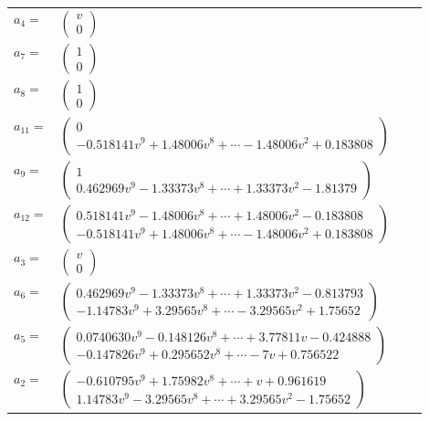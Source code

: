 \documentclass[1p]{elsarticle_modified}
\theoremstyle{definition}
\begin{document}
\begin{tabular}{m{7pt} m{180pt} m{7pt} m{180pt} }
\flushright $a_{4}=$&$\begin{pmatrix}v\\0\end{pmatrix}$ \\
\flushright $a_{7}=$&$\begin{pmatrix}1\\0\end{pmatrix}$ \\
\flushright $a_{8}=$&$\begin{pmatrix}1\\0\end{pmatrix}$ \\
\flushright $a_{11}=$&$\begin{pmatrix}0\\-0.518141 v^{9}+1.48006 v^{8}+\cdots-1.48006 v^{2}+0.183808\end{pmatrix}$ \\
\flushright $a_{9}=$&$\begin{pmatrix}1\\0.462969 v^{9}-1.33373 v^{8}+\cdots+1.33373 v^{2}-1.81379\end{pmatrix}$ \\
\flushright $a_{12}=$&$\begin{pmatrix}0.518141 v^{9}-1.48006 v^{8}+\cdots+1.48006 v^{2}-0.183808\\-0.518141 v^{9}+1.48006 v^{8}+\cdots-1.48006 v^{2}+0.183808\end{pmatrix}$ \\
\flushright $a_{3}=$&$\begin{pmatrix}v\\0\end{pmatrix}$ \\
\flushright $a_{6}=$&$\begin{pmatrix}0.462969 v^{9}-1.33373 v^{8}+\cdots+1.33373 v^{2}-0.813793\\-1.14783 v^{9}+3.29565 v^{8}+\cdots-3.29565 v^{2}+1.75652\end{pmatrix}$ \\
\flushright $a_{5}=$&$\begin{pmatrix}0.0740630 v^{9}-0.148126 v^{8}+\cdots+3.77811 v-0.424888\\-0.147826 v^{9}+0.295652 v^{8}+\cdots-7 v+0.756522\end{pmatrix}$ \\
\flushright $a_{2}=$&$\begin{pmatrix}-0.610795 v^{9}+1.75982 v^{8}+\cdots+v+0.961619\\1.14783 v^{9}-3.29565 v^{8}+\cdots+3.29565 v^{2}-1.75652\end{pmatrix}$ \\

\end{tabular}
\end{document}
